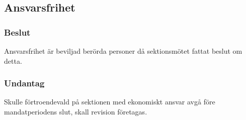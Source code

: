 \subsection{Ansvarsfrihet}

\subsubsection{Beslut}
Ansvarsfrihet är beviljad berörda personer då sektionsmötet fattat beslut om detta.

\subsubsection{Undantag}
Skulle förtroendevald på sektionen med ekonomiskt ansvar avgå före mandatperiodens slut, skall revision företagas.
